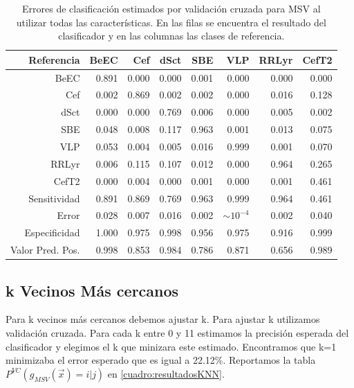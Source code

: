\documentclass[letterpaper,12pt]{book}
\begin{document}
\begin{table}[ht]
  \centering
  \begin{tabular}{rrrrrrrr}
    \hline
    \hline
    Referencia & BeEC & Cef & dSct & SBE & VLP & RRLyr & CefT2 \\ 
    \hline
    \hline
    BeEC & 0.891 & 0.000 & 0.000 & 0.001 & 0.000 & 0.000 & 0.000 \\ 
    Cef & 0.002 & 0.869 & 0.002 & 0.002 & 0.000 & 0.016 & 0.128 \\ 
    dSct & 0.000 & 0.000 & 0.769 & 0.006 & 0.000 & 0.005 & 0.002 \\ 
    SBE & 0.048 & 0.008 & 0.117 & 0.963 & 0.001 & 0.013 & 0.075 \\ 
    VLP & 0.053 & 0.004 & 0.005 & 0.016 & 0.999 & 0.001 & 0.070 \\ 
    RRLyr & 0.006 & 0.115 & 0.107 & 0.012 & 0.000 & 0.964 & 0.265 \\ 
    CefT2 & 0.000 & 0.004 & 0.000 & 0.001 & 0.000 & 0.001 & 0.461 \\ 
    \hline 
    \hline
    Sensitividad & 0.891 & 0.869 & 0.769 & 0.963 & 0.999 & 0.964 & 0.461 \\ 
    \hline
    Error &0.028 & 0.007 & 0.016 & 0.002 & $\sim 10^{-4}$ & 0.002 & 0.040 \\
    \hline
    \hline
    Especificidad & 1.000 & 0.975 & 0.998 & 0.956 & 0.975 & 0.916 & 0.999 \\ 
    \hline
    \hline
Valor Pred. Pos. & 0.998 & 0.853 & 0.984 & 0.786 & 0.871 & 0.656 & 0.989 \\ 
    \hline
    \hline

  \end{tabular}
  \caption{Errores de clasificación estimados por validación cruzada para MSV al utilizar todas las características. En las filas se encuentra el resultado del clasificador y en las columnas las clases de referencia.  }
  \label{cuadro:erroresTodasVariablesSVM}
\end{table}

\subsection{k Vecinos Más cercanos}

Para k vecinos más cercanos debemos ajustar k. Para ajustar k utilizamos validación cruzada. Para cada k entre 0 y 11 estimamos la precisión esperada del clasificador y elegimos el k que minizara este estimado. Encontramos que  k=1 minimizaba el error esperado que es igual a 22.12\%. Reportamos la tabla $P^{VC}(g_{MSV}(\vec{x})=i|j)$ en \ref{cuadro:resultadosKNN}. 
\end{document}
